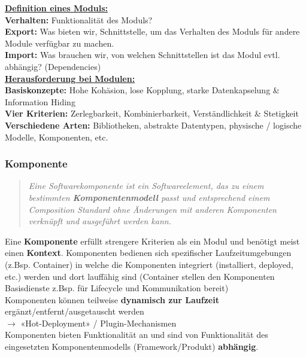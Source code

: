 \documentclass[a4paper]{article}
\begin{document}
	\textbf{\underline{Definition eines Moduls:}}\\
	\textbf{Verhalten:} Funktionalität des Moduls?\\
	\textbf{Export:} Was bieten wir, Schnittstelle, um das Verhalten des Moduls für andere Module verfügbar zu machen.\\
	\textbf{Import:} Was brauchen wir, von welchen Schnittstellen ist das Modul evtl. abhängig? (Dependencies)\\
	\newline
	\textbf{\underline{Herausforderung bei Modulen:}} \\
	\textbf{Basiskonzepte:} Hohe Kohäsion, lose Kopplung, starke Datenkapselung \& Information Hiding\\
	\textbf{Vier Kriterien:} Zerlegbarkeit, Kombinierbarkeit, Verständlichkeit \& Stetigkeit\\
	\textbf{Verschiedene Arten:} Bibliotheken, abstrakte Datentypen, physische / logische Modelle, Komponenten, etc.

	\subsubsection{Komponente}
	\begin{quote}
		\textit{Eine Softwarekomponente ist ein Softwareelement, das zu einem
bestimmten \textbf{Komponentenmodell} passt und entsprechend
einem Composition Standard ohne Änderungen mit anderen
Komponenten verknüpft und ausgeführt werden kann.}
	\end{quote}
	Eine \textbf{Komponente} erfüllt strengere Kriterien als ein Modul und benötigt meist einen \textbf{Kontext}.
	Komponenten bedienen sich spezifischer Laufzeitumgebungen (z.Bsp. Container) in welche die Komponenten integriert (installiert, deployed, etc.) werden und dort lauffähig sind (Container stellen den Komponenten Basisdienste z.Bsp. für Lifecycle und Kommunikation bereit)\\
	Komponenten können teilweise \textbf{dynamisch zur Laufzeit} ergänzt/entfernt/ausgetauscht werden
	\\ \indent $\rightarrow$ «Hot-Deployment» / Plugin-Mechanismen\\
	Komponenten bieten Funktionalität an und sind von Funktionalität des eingesetzten Komponentenmodells (Framework/Produkt) \textbf{abhängig}.\\
	
\end{document}
